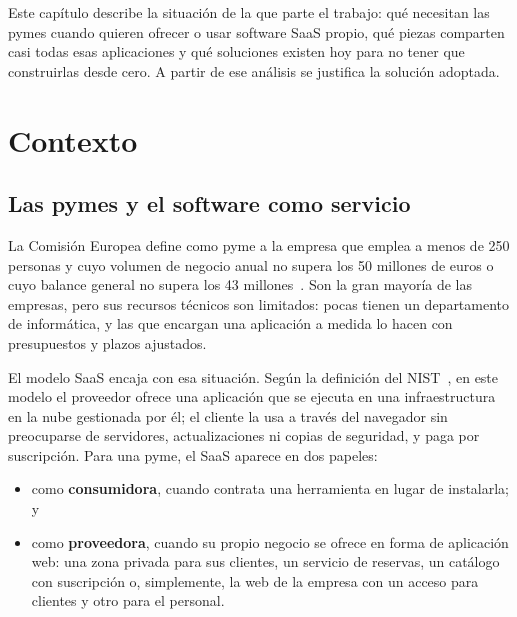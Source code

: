 
Este capítulo describe la situación de la que parte el trabajo: qué necesitan
las pymes cuando quieren ofrecer o usar software SaaS propio, qué piezas
comparten casi todas esas aplicaciones y qué soluciones existen hoy para no
tener que construirlas desde cero. A partir de ese análisis se justifica la
solución adoptada.

\section{Contexto}
\label{sec:ctx-contexto}

\subsection{Las pymes y el software como servicio}
\label{sec:ctx-pymes-saas}

La Comisión Europea define como pyme a la empresa que emplea a menos de 250
personas y cuyo volumen de negocio anual no supera los 50 millones de euros o
cuyo balance general no supera los 43 millones~\cite{ec-sme-definition}. Son
la gran mayoría de las empresas, pero sus recursos técnicos son limitados:
pocas tienen un departamento de informática, y las que encargan una aplicación
a medida lo hacen con presupuestos y plazos ajustados.

El modelo SaaS encaja con esa situación. Según la definición del
NIST~\cite{nist-cloud}, en este modelo el proveedor ofrece una aplicación que
se ejecuta en una infraestructura en la nube gestionada por él; el cliente la
usa a través del navegador sin preocuparse de servidores, actualizaciones ni
copias de seguridad, y paga por suscripción. Para una pyme, el SaaS aparece en
dos papeles:

\begin{itemize}
  \item como \textbf{consumidora}, cuando contrata una herramienta en lugar de
        instalarla; y
  \item como \textbf{proveedora}, cuando su propio negocio se ofrece en
        forma de aplicación web: una zona privada para sus clientes, un
        servicio de reservas, un catálogo con suscripción o, simplemente, la
        web de la empresa con un acceso para clientes y otro para el
        personal.
\end{itemize}


